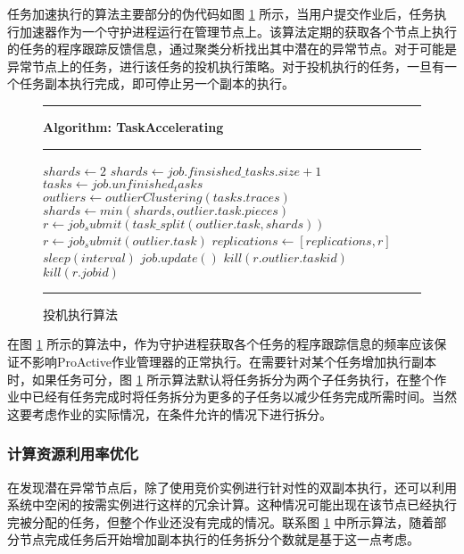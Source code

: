 任务加速执行的算法主要部分的伪代码如图 \ref{fig-acc-algo} 所示，当用户提交作业后，任务执行加速器作为一个守护进程运行在管理节点上。该算法定期的获取各个节点上执行的任务的程序跟踪反馈信息，通过聚类分析找出其中潜在的异常节点。对于可能是异常节点上的任务，进行该任务的投机执行策略。对于投机执行的任务，一旦有一个任务副本执行完成，即可停止另一个副本的执行。
\begin{figure}
\rule[-.2pt]{0.9\textwidth}{0.9pt}

\textbf{Algorithm: TaskAccelerating}

\rule[-.2pt]{0.9\textwidth}{0.5pt}

\begin{algorithmic}[1]

\State $shards\gets 2$
        \State $shards\gets job.finsished\_tasks.size + 1$
    \EndIf
    \State $tasks\gets job.unfinished_tasks$
    \State $outliers\gets outlierClustering(tasks.traces)$
                \State $shards\gets min(shards, outlier.task.pieces)$
                \State $r\gets job_submit(task\_split(outlier.task, shards))$
            \Else{}
                \State $r\gets job_submit(outlier.task)$                
            \EndIf
            \State $replications\gets [replications, r]$
        \EndIf
    \EndFor
    \State $sleep(interval)$
    \State $job.update()$
            \State $kill(r.outlier.taskid)$
            \State $kill(r.jobid)$
        \EndIf
    \EndFor
\EndWhile
\end{algorithmic}
\rule[-.2pt]{0.9\textwidth}{0.8pt}
\caption{投机执行算法}\label{fig-acc-algo}
\end{figure}

在图 \ref{fig-acc-algo} 所示的算法中，作为守护进程获取各个任务的程序跟踪信息的频率应该保证不影响ProActive作业管理器的正常执行。在需要针对某个任务增加执行副本时，如果任务可分，图 \ref{fig-acc-algo} 所示算法默认将任务拆分为两个子任务执行，在整个作业中已经有任务完成时将任务拆分为更多的子任务以减少任务完成所需时间。当然这要考虑作业的实际情况，在条件允许的情况下进行拆分。

\subsubsection{计算资源利用率优化}
在发现潜在异常节点后，除了使用竞价实例进行针对性的双副本执行，还可以利用系统中空闲的按需实例进行这样的冗余计算。这种情况可能出现在该节点已经执行完被分配的任务，但整个作业还没有完成的情况。联系图 \ref{fig-acc-algo} 中所示算法，随着部分节点完成任务后开始增加副本执行的任务拆分个数就是基于这一点考虑。

